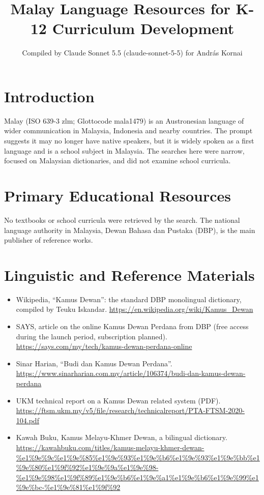 \documentclass[12pt]{article}
\title{Malay Language Resources for K-12 Curriculum Development}
\author{Compiled by Claude Sonnet 5.5 (claude-sonnet-5-5) for Andr\'as Kornai}
\date{}
\begin{document}
\maketitle

\section{Introduction}
Malay (ISO 639-3 zlm; Glottocode mala1479) is an Austronesian language of wider communication in Malaysia, Indonesia and nearby countries. The prompt suggests it may no longer have native speakers, but it is widely spoken as a first language and is a school subject in Malaysia. The searches here were narrow, focused on Malaysian dictionaries, and did not examine school curricula.

\section{Primary Educational Resources}
No textbooks or school curricula were retrieved by the search. The national language authority in Malaysia, Dewan Bahasa dan Pustaka (DBP), is the main publisher of reference works.

\section{Linguistic and Reference Materials}
\begin{itemize}
\item Wikipedia, ``Kamus Dewan'': the standard DBP monolingual dictionary, compiled by Teuku Iskandar. \url{https://en.wikipedia.org/wiki/Kamus_Dewan}
\item SAYS, article on the online Kamus Dewan Perdana from DBP (free access during the launch period, subscription planned). \url{https://says.com/my/tech/kamus-dewan-perdana-online}
\item Sinar Harian, ``Budi dan Kamus Dewan Perdana''. \url{https://www.sinarharian.com.my/article/106374/budi-dan-kamus-dewan-perdana}
\item UKM technical report on a Kamus Dewan related system (PDF). \url{https://ftsm.ukm.my/v5/file/research/technicalreport/PTA-FTSM-2020-104.pdf}
\item Kawah Buku, Kamus Melayu-Khmer Dewan, a bilingual dictionary. \url{https://kawahbuku.com/titles/kamus-melayu-khmer-dewan-%e1%9e%9c%e1%9e%85%e1%9e%93%e1%9e%b6%e1%9e%93%e1%9e%bb%e1%9e%80%e1%9f%92%e1%9e%9a%e1%9e%98-%e1%9e%98%e1%9f%89%e1%9e%b6%e1%9e%a1%e1%9e%b6%e1%9e%99%e1%9e%bc-%e1%9e%81%e1%9f%92}
\end{itemize}
\end{document}

